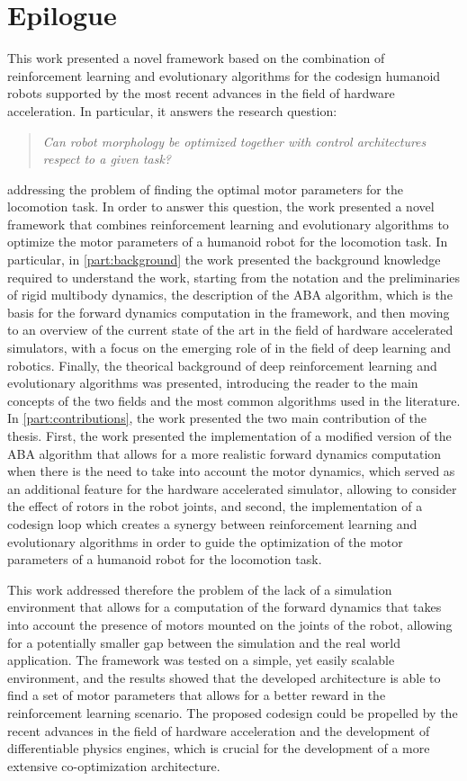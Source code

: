 \chapter*{Epilogue}
\label{chp:99-Epilogue}

This work presented a novel framework based on the combination of reinforcement learning and evolutionary algorithms for the codesign humanoid robots supported by the most recent advances in the field of hardware acceleration. In particular, it answers the research question:

\begin{quote}
    \textit{
        Can robot morphology be optimized together with control architectures respect to a given task?}
\end{quote}

addressing the problem of finding the optimal motor parameters for the locomotion task.
In order to answer this question, the work presented a novel framework that combines reinforcement learning and evolutionary algorithms to optimize the motor parameters of a humanoid robot for the locomotion task. In particular, in \cref{part:background} the work presented the background knowledge required to understand the work, starting from the notation and the preliminaries of rigid multibody dynamics, the description of the \ac{ABA} algorithm, which is the basis for the forward dynamics computation in the framework, and then moving to an overview of the current state of the art in the field of hardware accelerated simulators, with a focus on the emerging role of \jax in the field of deep learning and robotics. Finally, the theorical background of deep reinforcement learning and evolutionary algorithms was presented, introducing the reader to the main concepts of the two fields and the most common algorithms used in the literature. In \cref{part:contributions}, the work presented the two main contribution of the thesis. First, the work presented the implementation of a modified version of the \ac{ABA} algorithm that allows for a more realistic forward dynamics computation when there is the need to take into account the motor dynamics, which served as an additional feature for the hardware accelerated \jaxsim simulator, allowing to consider the effect of rotors in the robot joints, and second, the implementation of a codesign loop which creates a synergy between reinforcement learning and evolutionary algorithms in order to guide the optimization of the motor parameters of a humanoid robot for the locomotion task.

This work addressed therefore the problem of the lack of a simulation environment that allows for a computation of the forward dynamics that takes into account the presence of motors mounted on the joints of the robot, allowing for a potentially smaller gap between the simulation and the real world application. The framework was tested on a simple, yet easily scalable environment, and the results showed that the developed architecture is able to find a set of motor parameters that allows for a better reward in the reinforcement learning scenario.
The proposed codesign could be propelled by the recent advances in the field of hardware acceleration and the development of differentiable physics engines, which is crucial for the development of a more extensive co-optimization architecture.